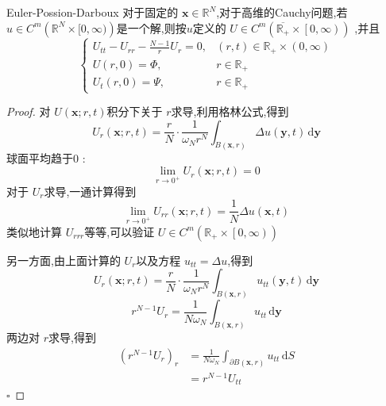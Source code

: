 \documentclass[../../PDE.tex]{subfiles}
\begin{document}
\begin{theorem}{Euler-Possion-Darboux}
    对于固定的 \(  \mathbf{x}\in \mathbb{R} ^{N}  \),对于高维的Cauchy问题,若 \(  u \in C^{m}\left( \mathbb{R} ^{N}\times [0,\infty)  \right)   \)是一个解,则按\(  u  \)定义的 \(  U \in C^{m}\left( \overline{\mathbb{R} _{+ }} \times \left[ 0,\infty \right) \right)   \)     ,并且 
    \begin{equation}
     \begin{cases}  U_{tt}-U_{rr}-\frac{N-1 }{r }U_{r}= 0,&\left( r,t \right) \in \mathbb{R} _{+ }\times \left( 0,\infty \right)\\ 
        U\left( r,0 \right)= \Phi ,& r\in \mathbb{R} _{+ }\\ 
         U_{t}\left( r,0 \right)= \Psi ,&r\in \mathbb{R} _{+ }   \end{cases}    
    \end{equation}
\end{theorem}
\begin{proof}
    对 \(  U\left( \mathbf{x};r,t \right)   \)积分下关于 \(  r  \)求导,利用格林公式,得到 \[
    U_{r}\left( \mathbf{x};r,t \right)= \frac{r }{N } \cdot \frac{1 }{ \omega _{N}r^{N} } \int_{B\left( \mathbf{x},r \right) } \Delta u\left( \mathbf{y},t \right)\,\mathrm{d} \mathbf{y}    
    \]球面平均趋于0 : \[
    \lim_{r\to 0^{+ }}U_{r}\left( \mathbf{x};r,t \right)= 0 
    \]  对于 \(  U_{r}  \)求导,一通计算得到 \[
    \lim_{r\to 0^{+ }}U_{rr}\left( \mathbf{x};r,t \right)= \frac{1 }{N } \Delta u\left( \mathbf{x},t \right)   
    \] 类似地计算 \(  U_{rrr}  \)等等,可以验证 \(  U\in C^{m}\left( \mathbb{R} _{+ }\times \left[ 0,\infty \right)  \right)   \)  


    另一方面,由上面计算的 \(  U_{r}  \)以及方程 \(  u_{tt}=  \Delta u  \),得到 \[
    U_{r}\left( \mathbf{x};r,t \right)= \frac{r }{N }\cdot \frac{1 }{ \omega _{N}r^{N}  }\int_{B\left( \mathbf{x},r \right) }u_{tt}\left( \mathbf{y} ,t\right)\,\mathrm{d} \mathbf{y}    
    \]  \[
    r^{N-1}U_{r}= \frac{1}{N \omega _{N}}\int_{B\left( \mathbf{x},r \right) }u_{tt}\,\mathrm{d} \mathbf{y}
    \]两边对 \(  r  \)求导,得到 \[
  \begin{aligned}
    \left( r^{N-1}U_{r} \right)_{r}&= \frac{1 }{N \omega _{N} } \int_{ \partial B\left( \mathbf{x},r \right) }u_{tt}\,\mathrm{d} S\\ 
     & = r^{N-1}U_{tt}   
  \end{aligned}
    \] 
    \hfill $\square$
\end{proof}
\end{document}
